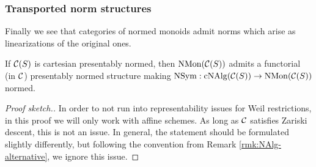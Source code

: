 \documentclass{amsart}
\renewcommand{\todo}[1]{}
\numberwithin{proposition}{section}
\numberwithin{equation}{section}
\def\NSym{\mathrm{NSym}}
\def\NMon{\mathrm{NMon}}
\def\cNAlg{\mathrm{cNAlg}}
\begin{document}
\subsubsection{Transported norm structures}
Finally we see that categories of normed monoids admit norms which arise as linearizations of the original ones.
\begin{lemma} \label{lemm:norms-for-nhopf}
If $\mathcal C(S)$ is cartesian presentably normed, then $\NMon(\scr C(S))$ admits a functorial (in $\mathcal C$) presentably normed structure making $\NSym: \cNAlg(\scr C(S)) \to \NMon(\scr C(S))$ normed.
\end{lemma}
\begin{proof}[Proof sketch.]\todo{...}
In order to not run into representability issues for Weil restrictions, in this proof we will only work with affine schemes.
As long as $\mathcal C$ satisfies Zariski descent, this is not an issue.
In general, the statement should be formulated slightly differently, but following the convention from Remark \ref{rmk:NAlg-alternative}, we ignore this issue.


\end{proof}
\end{document}
